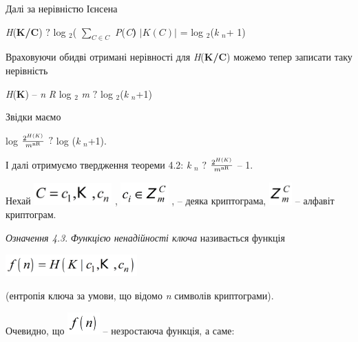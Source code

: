 \documentclass[a4paper]{article}
\newcounter{}
\newcommand\normalsubformula[1]{\text{\mathversion{normal}$#1$}}
\begin{document}
Далі за нерівністю Ієнсена

{\centering
\textit{H}(\textbf{K}\textbf{/}\textbf{C})   ${?}$ log ${{}_{{2}}}$(
${\underset{{C\in C}}{\sum }{}}$ \textit{P}(\textit{C}\textbf{) } ${|K(C)|}$ = 
log ${{}_{{2}}}$(\textit{k} ${{}_{{n}}}$+ 1) $ $
\par}

Враховуючи обидві отримані нерівності для 
\textit{H}(\textbf{K}\textbf{/}\textbf{C}) можемо тепер записати таку
нерівність 

{\centering
\textit{H}(\textbf{K}) – \textit{n}\textit{ }\textit{R} log ${{}_{{2}}}$
\textit{m}   ${?}$  log ${{}_{{2}}}$(\textit{k} ${{}_{{n}}}$+1)
\par}

Звідки  маємо

{\centering
log  ${\frac{2^{H(K)}}{m^{\normalsubformula{\text{nR}}}}}$   ${?}$  log
(\textit{k} ${{}_{{n}}}$+1).
\par}

І  далі отримуємо твердження теореми 4.2:  \textit{k} ${{}_{{n}}}$   ${?}$  
${\frac{2^{{H(K)}}}{m^{{\normalsubformula{\text{nR}}}}}}$  – 1. 

Нехай 
\includegraphics[width=1.1764in,height=0.3327in]{crypt-img/crypt-img38.png} ,  
\includegraphics[width=0.7201in,height=0.3472in]{crypt-img/crypt-img39.png} , –
деяка криптограма, 
\includegraphics[width=0.3465in,height=0.3465in]{crypt-img/crypt-img40.png}  –
алфавіт криптограм.

\textit{Означення 4.3}. \textit{Функцією ненадійності ключа} називається 
функція 

{\centering 
\includegraphics[width=1.9882in,height=0.3346in]{crypt-img/crypt-img41.png}
\par}

(ентропія ключа за умови, що відомо \textit{n }символів криптограми).

Очевидно, що 
\includegraphics[width=0.4874in,height=0.3354in]{crypt-img/crypt-img42.png}  –
незростаюча функція, а саме:
\end{document}
